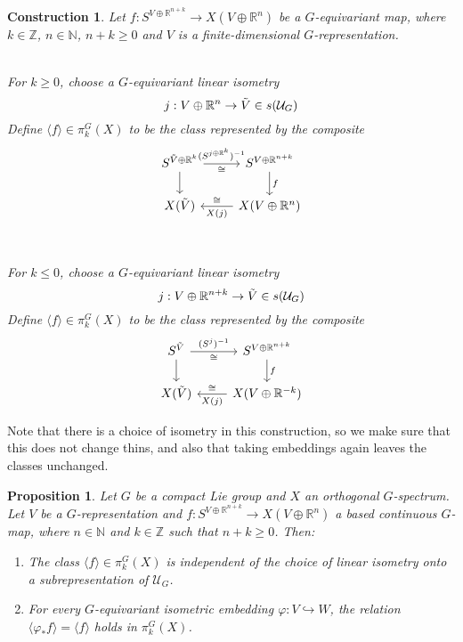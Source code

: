 \documentclass{scrartcl}
\newcommand{\bN}{\mathbb{N}}
\newcommand{\bZ}{\mathbb{Z}}
\newcommand{\bR}{\mathbb{R}}
\newtheorem{prop}[subsection]{Proposition}
\newtheorem{cons}[subsection]{Construction}
\begin{document}
\begin{cons}
    Let $f:S^{V\oplus \bR^{n+k}}\to X(V\oplus \bR^n)$ be a $G$-equivariant map, where $k\in \bZ$, $n\in\bN$, $n+k\geq 0$ and $V$ is a finite-dimensional $G$-representation. \\ \\
    \begin{minipage}{.475\textwidth}
        For $k\geq 0$, choose a $G$-equivariant linear isometry $$j:V\oplus\bR^n\to \Tilde{V}\in s(\mathcal{U}_G)$$ Define $\langle f\rangle\in\pi^G_k(X)$ to be the class represented by the composite 
        \[\begin{tikzcd}
            S^{\Tilde{V}\oplus\bR^k} \arrow[r, "(S^{j\oplus \bR^k})^{-1}", "\cong"'] \arrow[d] & S^{V\oplus\bR^{n+k}} \arrow[d, "f"] \\ X(\Tilde{V}) &  X(V\oplus\bR^n) \arrow[l, "X(j)", "\cong"']
        \end{tikzcd}\]
    \end{minipage}  
    \begin{minipage}{.05\textwidth} \ \end{minipage}
    \begin{minipage}{.475\textwidth}
        For $k\leq 0$, choose a $G$-equivariant linear isometry $$j:V\oplus\bR^{n+k}\to \Tilde{V}\in s(\mathcal{U}_G)$$ Define $\langle f\rangle\in\pi^G_k(X)$ to be the class represented by the composite
        \[\begin{tikzcd}
            S^{\Tilde{V}} \arrow[r, "(S^{j})^{-1}", "\cong"'] \arrow[d] & S^{V\oplus\bR^{n+k}} \arrow[d, "f"] \\ X(\Tilde{V}) &  X(V\oplus\bR^{-k}) \arrow[l, "X(j)", "\cong"']
        \end{tikzcd}\]
    \end{minipage}
\end{cons}

Note that there is a choice of isometry in this construction, so we make sure that this does not change thins, and also that taking embeddings again leaves the classes unchanged.

\begin{prop}{\normalfont \cite[3.1.14]{GHT}}
    Let $G$ be a compact Lie group and $X$ an orthogonal $G$-spectrum. Let $V$ be a $G$-representation and $f:S^{V\oplus\bR^{n+k}}\to X(V\oplus\bR^n)$ a based continuous $G$-map, where $n\in\bN$ and $k\in\bZ$ such that $n+k\geq 0$. Then:
    \begin{enumerate}
        \item The class $\langle f\rangle\in\pi^G_k(X)$ is independent of the choice of linear isometry onto a subrepresentation of $\mathcal{U}_G$.
        \item For every $G$-equivariant isometric embedding $\varphi:V\hookrightarrow W$, the relation $\langle \varphi_*f\rangle = \langle f\rangle$ holds in $\pi^G_k(X)$.
    \end{enumerate}
\end{prop}
\end{document}
